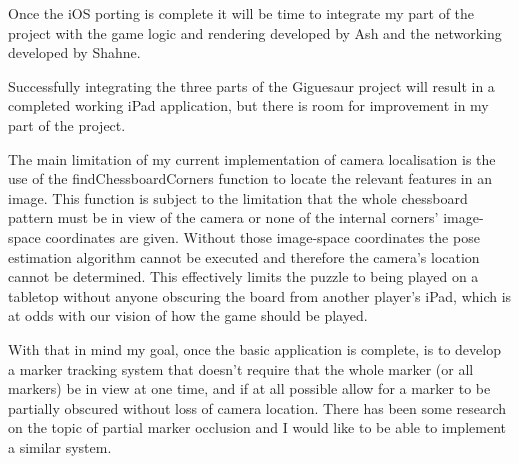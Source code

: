 \documentclass{article}
\begin{document}
Once the iOS porting is complete it will be time to integrate my part of the project with the game logic and rendering developed by Ash and the networking developed by Shahne. 

Successfully integrating the three parts of the Giguesaur project will result in a completed working iPad application, but there is room for improvement in my part of the project. 

The main limitation of my current implementation of camera localisation is the use of the findChessboardCorners function to locate the relevant features in an image. This function is subject to the limitation that the whole chessboard pattern must be in view of the camera or none of the internal corners' image-space coordinates are given. Without those image-space coordinates the pose estimation algorithm cannot be executed and therefore the camera's location cannot be determined. This effectively limits the puzzle to being played on a tabletop without anyone obscuring the board from another player's iPad, which is at odds with our vision of how the game should be played.

With that in mind my goal, once the basic application is complete, is to develop a marker tracking system that doesn't require that the whole marker (or all markers) be in view at one time, and if at all possible allow for a marker to be partially obscured without loss of camera location. There has been some research on the topic of partial marker occlusion \cite{occlusion} and I would like to be able to implement a similar system. 




\nocite{*}


\end{document}
